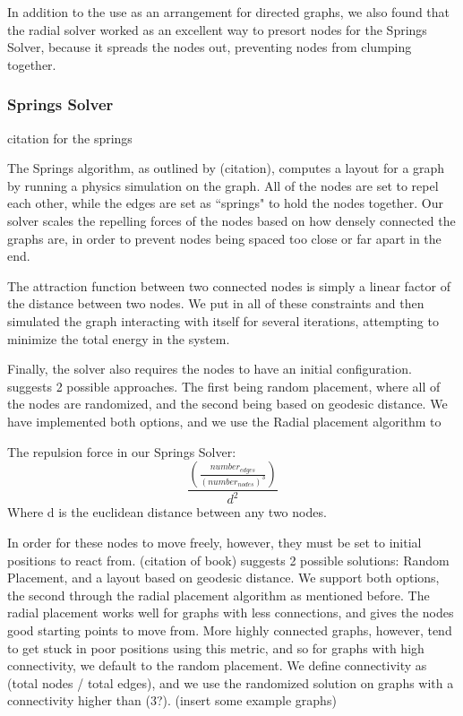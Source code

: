 \documentclass{article}
\begin{document}

In addition to the use as an arrangement for directed graphs, we also found that the radial solver worked as an excellent way to presort nodes for the Springs Solver, because it spreads the nodes out, preventing nodes from clumping together.


\subsubsection{Springs Solver}
citation for the springs\cite{springs}


The Springs algorithm, as outlined by (citation), computes a layout for a graph by running a physics simulation on the graph. All of the nodes are set to repel each other, while the edges are set as ``springs" to hold the nodes together. Our solver scales the repelling forces of the nodes based on how densely connected the graphs are, in order to prevent nodes being spaced too close or far apart in the end.

The attraction function between two connected nodes is simply a linear factor of the distance between two nodes. We put in all of these constraints and then simulated the graph interacting with itself for several iterations, attempting to minimize the total energy in the system.

Finally, the solver also requires the nodes to have an initial configuration. 
suggests 2 possible approaches. The first being random placement, where all of the nodes are randomized, and the second being based on geodesic distance. We have implemented both options, and we use the Radial placement algorithm to 


The repulsion force in our Springs Solver:
$$ \frac{(\frac{number_{edges}}{(number_{nodes})^{3}})}{d^2} $$
Where d is the euclidean distance between any two nodes. 



 

In order for these nodes to move freely, however, they must be set to initial positions to react from. (citation of book) suggests 2 possible solutions: 
Random Placement, and a layout based on geodesic distance. We support both options, the second through the radial placement algorithm as mentioned before.
The radial placement works well for graphs with less connections, and gives the nodes good starting points to move from. More highly connected graphs,
however, tend to get stuck in poor positions using this metric, and so for graphs with high connectivity, we default to the random placement. We define 
connectivity as (total nodes / total edges), and we use the randomized solution on graphs with a connectivity higher than (3?).
(insert some example graphs)
\end{document}
